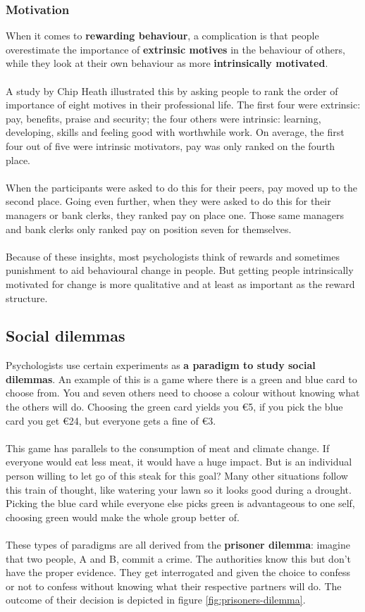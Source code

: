 \documentclass[../summary.tex]{subfiles}
\begin{document}
\subsubsection{Motivation}
When it comes to \textbf{rewarding behaviour}, a complication is that people overestimate the importance of \textbf{extrinsic motives} in the behaviour of others, while they look at their own behaviour as more \textbf{intrinsically motivated}.
\\\\
A study by Chip Heath illustrated this by asking people to rank the order of importance of eight motives in their professional life. The first four were extrinsic: pay, benefits, praise and security; the four others were intrinsic: learning, developing, skills and feeling good with worthwhile work. On average, the first four out of five were intrinsic motivators, pay was only ranked on the fourth place.
\\\\
When the participants were asked to do this for their peers, pay moved up to the second place. Going even further, when they were asked to do this for their managers or bank clerks, they ranked pay on place one. Those same managers and bank clerks only ranked pay on position seven for themselves.
\\\\
Because of these insights, most psychologists think of rewards and sometimes punishment to aid behavioural change in people. But getting people intrinsically motivated for change is more qualitative and at least as important as the reward structure.
\newpage
\subsection{Social dilemmas}
\label{sec:social-dilemmas}
Psychologists use certain experiments as \textbf{a paradigm to study social dilemmas}. An example of this is a game where there is a green and blue card to choose from. You and seven others need to choose a colour without knowing what the others will do. Choosing the green card yields you \euro{5}, if you pick the blue card you get \euro{24}, but everyone gets a fine of \euro{3}.
\\\\
This game has parallels to the consumption of meat and climate change. If everyone would eat less meat, it would have a huge impact. But is an individual person willing to let go of this steak for this goal? Many other situations follow this train of thought, like watering your lawn so it looks good during a drought. Picking the blue card while everyone else picks green is advantageous to one self, choosing green would make the whole group better of.
\\\\
These types of paradigms are all derived from the \textbf{prisoner dilemma}: imagine that two people, A and B, commit a crime. The authorities know this but don't have the proper evidence. They get interrogated and given the choice to confess or not to confess without knowing what their respective partners will do. The outcome of their decision is depicted in figure \ref{fig:prisoners-dilemma}.
\\
\end{document}
